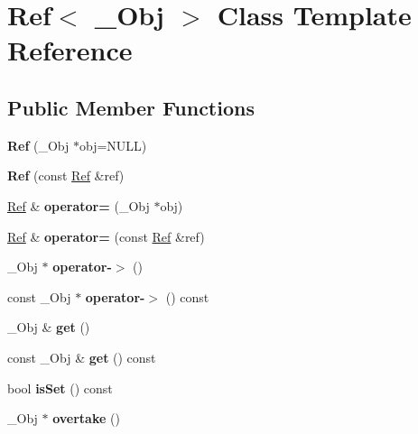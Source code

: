 \hypertarget{class_ref}{
\section{Ref$<$ \_\-Obj $>$ Class Template Reference}
\label{class_ref}
}
\subsection*{Public Member Functions}
\begin{DoxyCompactItemize}
\item 
\hypertarget{class_ref_ab472819ab46f47fa14cf13acf795c225}{
{\bfseries Ref} (\_\-Obj $\ast$obj=NULL)}
\label{class_ref_ab472819ab46f47fa14cf13acf795c225}

\item 
\hypertarget{class_ref_ad0e4e1603d8339085ccbafae4a87257c}{
{\bfseries Ref} (const \hyperlink{class_ref}{Ref} \&ref)}
\label{class_ref_ad0e4e1603d8339085ccbafae4a87257c}

\item 
\hypertarget{class_ref_aea9194cc5255531623149d315aaced43}{
\hyperlink{class_ref}{Ref} \& {\bfseries operator=} (\_\-Obj $\ast$obj)}
\label{class_ref_aea9194cc5255531623149d315aaced43}

\item 
\hypertarget{class_ref_ae2b5451a40128c1ce12c2203691ef251}{
\hyperlink{class_ref}{Ref} \& {\bfseries operator=} (const \hyperlink{class_ref}{Ref} \&ref)}
\label{class_ref_ae2b5451a40128c1ce12c2203691ef251}

\item 
\hypertarget{class_ref_a30afe99009adaee4d040f0f2694312df}{
\_\-Obj $\ast$ {\bfseries operator-\/$>$} ()}
\label{class_ref_a30afe99009adaee4d040f0f2694312df}

\item 
\hypertarget{class_ref_a309b1f5d476c2b12059eb08dc0058cb9}{
const \_\-Obj $\ast$ {\bfseries operator-\/$>$} () const }
\label{class_ref_a309b1f5d476c2b12059eb08dc0058cb9}

\item 
\hypertarget{class_ref_ae2713e9b0692496fe6fb178adb9b9aa4}{
\_\-Obj \& {\bfseries get} ()}
\label{class_ref_ae2713e9b0692496fe6fb178adb9b9aa4}

\item 
\hypertarget{class_ref_add3de709986df401709259b7ea542de5}{
const \_\-Obj \& {\bfseries get} () const }
\label{class_ref_add3de709986df401709259b7ea542de5}

\item 
\hypertarget{class_ref_aebd1652015a6ebec85e8fd232476cf43}{
bool {\bfseries isSet} () const }
\label{class_ref_aebd1652015a6ebec85e8fd232476cf43}

\item 
\hypertarget{class_ref_a33efbfb288dd568f890969594e96a10a}{
\_\-Obj $\ast$ {\bfseries overtake} ()}
\label{class_ref_a33efbfb288dd568f890969594e96a10a}

\end{DoxyCompactItemize}
